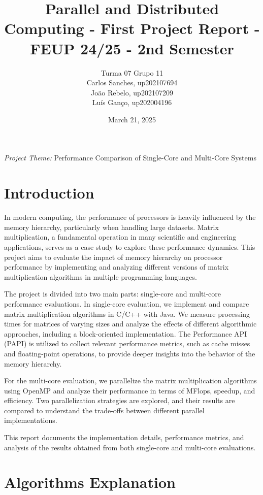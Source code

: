 \documentclass{article}
\title{Parallel and Distributed Computing - First Project Report - FEUP 24/25 - 2nd Semester}
\author{
Turma 07 Grupo 11 \\
Carlos Sanches, up202107694 \\
João Rebelo, up202107209 \\
Luís Ganço, up202004196
}
\date{March 21, 2025}
\begin{document}
\newpage 

\maketitle
\begin{center}
    \large \textit{Project Theme:} Performance Comparison of Single-Core and Multi-Core Systems
\end{center}
\newpage
\tableofcontents
\newpage %

\section{Introduction}

In modern computing, the performance of processors is heavily influenced by the memory hierarchy, particularly when handling large datasets. Matrix multiplication, a fundamental operation in many scientific and engineering applications, serves as a case study to explore these performance dynamics. This project aims to evaluate the impact of memory hierarchy on processor performance by implementing and analyzing different versions of matrix multiplication algorithms in multiple programming languages.

The project is divided into two main parts: single-core and multi-core performance evaluations. In single-core evaluation, we implement and compare matrix multiplication algorithms in C/C++ with Java. We measure processing times for matrices of varying sizes and analyze the effects of different algorithmic approaches, including a block-oriented implementation. The Performance API (PAPI) is utilized to collect relevant performance metrics, such as cache misses and floating-point operations, to provide deeper insights into the behavior of the memory hierarchy.

For the multi-core evaluation, we parallelize the matrix multiplication algorithms using OpenMP and analyze their performance in terms of MFlops, speedup, and efficiency. Two parallelization strategies are explored, and their results are compared to understand the trade-offs between different parallel implementations.

This report documents the implementation details, performance metrics, and analysis of the results obtained from both single-core and multi-core evaluations. 

\section{Algorithms Explanation}
\end{document}
